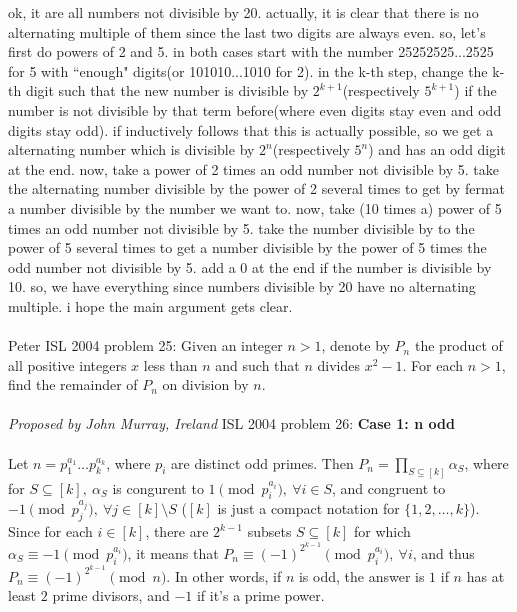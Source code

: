 ok, it are all numbers not divisible by 20. actually, it is clear that there is no alternating multiple of them since the last two digits are always even. so, let's first do powers of 2 and 5. in both cases start with the number 25252525...2525 for 5 with ``enough" digits(or 101010...1010 for 2). in the k-th step, change the k-th digit such that the new number is divisible by $2^{k+1}$(respectively $5^{k+1}$) if the number is not divisible by that term before(where even digits stay even and odd digits stay odd). if inductively follows that this is actually possible, so we get a alternating number which is divisible by $2^n$(respectively $5^n$) and has an odd digit at the end. now, take a power of 2 times an odd number not divisible by 5. take the alternating number divisible by the power of 2 several times to get by fermat a number divisible by the number we want to. now, take (10 times a) power of 5 times an odd number not divisible by 5. take the number divisible by to the power of 5 several times to get a number divisible by the power of 5 times the odd number not divisible by 5. add a 0 at the end if the number is divisible by 10. so, we have everything since numbers divisible by 20 have no alternating multiple. i hope the main argument gets clear. \\\\
Peter 
ISL 2004 problem 25:  Given an integer ${n>1}$, denote by $P_n$ the product of all positive integers $x$ less than $n$ and such that $n$ divides ${x^2-1}$. For each ${n>1}$, find the remainder of $P_n$ on division by $n$. \\\\
\textit{Proposed by John Murray, Ireland} 
ISL 2004 problem 26:  \textbf{Case 1: n odd} \\\\
Let $n=p_1^{a_1}\ldots p_k^{a_k}$, where $p_i$ are distinct odd primes. Then $P_n=\prod_{S\subseteq [k]}\alpha_S$, where for $S\subseteq[k],\ \alpha_S$ is congurent to $1\pmod{p_i^{a_i}},\ \forall i\in S$, and congruent to $-1\pmod{p_j^{a_j}},\ \forall j\in[k]\setminus S$ ($[k]$ is just a compact notation for $\{1,2,\ldots,k\}$). Since for each $i\in[k]$, there are $2^{k-1}$ subsets $S\subseteq[k]$ for which $\alpha_S\equiv-1\pmod{p_i^{a_i}}$, it means that $P_n\equiv (-1)^{2^{k-1}}\pmod {p_i^{a_i}},\ \forall i$, and thus $P_n\equiv(-1)^{2^{k-1}}\pmod n$. In other words, if $n$ is odd, the answer is $1$ if $n$ has at least $2$ prime divisors, and $-1$ if it's a prime power. \\\\
